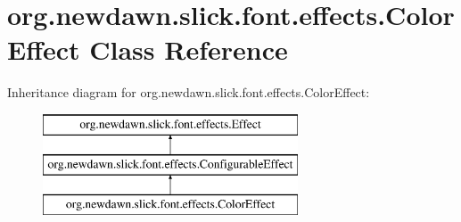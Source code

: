 \hypertarget{classorg_1_1newdawn_1_1slick_1_1font_1_1effects_1_1_color_effect}{}\section{org.\+newdawn.\+slick.\+font.\+effects.\+Color\+Effect Class Reference}
\label{classorg_1_1newdawn_1_1slick_1_1font_1_1effects_1_1_color_effect}
Inheritance diagram for org.\+newdawn.\+slick.\+font.\+effects.\+Color\+Effect\+:\begin{figure}[H]
\begin{center}
\leavevmode
\includegraphics[height=3.000000cm]{classorg_1_1newdawn_1_1slick_1_1font_1_1effects_1_1_color_effect}
\end{center}
\end{figure}
